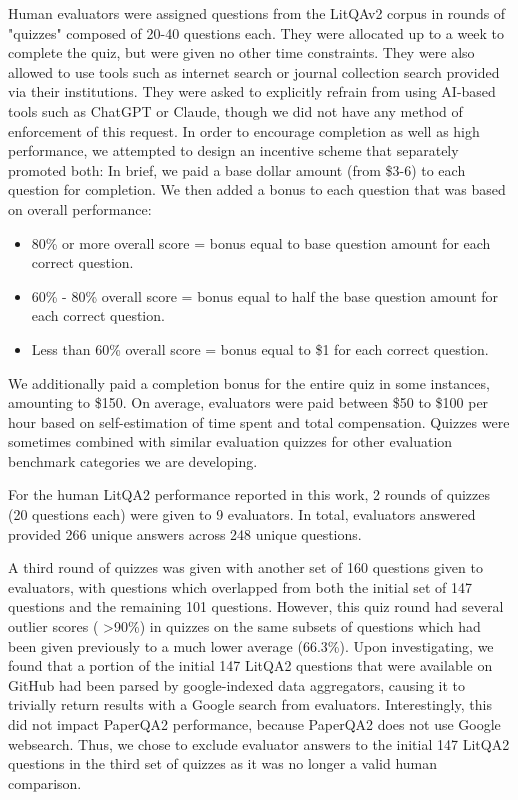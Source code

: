 Human evaluators were assigned questions from the LitQAv2 corpus in rounds of "quizzes" composed of 20-40 questions each. They were allocated up to a week to complete the quiz, but were given no other time constraints. They were also allowed to use tools such as internet search or journal collection search provided via their institutions. They were asked to explicitly refrain from using AI-based tools such as ChatGPT or Claude, though we did not have any method of enforcement of this request. In order to encourage completion as well as high performance, we attempted to design an incentive scheme that separately promoted both: In brief, we paid a base dollar amount (from \$3-6) to each question for completion. We then added a bonus to each question that was based on overall performance: 
\begin{itemize}
    \item{80\% or more overall score = bonus equal to base question amount for each correct question.}
    \item{60\% - 80\% overall score = bonus equal to half the base question amount for each correct question.}
    \item{Less than 60\% overall score = bonus equal to \$1 for each correct question.}
\end{itemize}

We additionally paid a completion bonus for the entire quiz in some instances, amounting to \$150. On average, evaluators were paid between \$50 to \$100 per hour based on self-estimation of time spent and total compensation. Quizzes were sometimes combined with similar evaluation quizzes for other evaluation benchmark categories we are developing.

For the human LitQA2 performance reported in this work, 2 rounds of quizzes (20 questions each) were given to 9 evaluators. In total, evaluators answered provided 266 unique answers across 248 unique questions.

A third round of quizzes was given with another set of 160 questions given to evaluators, with questions which overlapped from both the initial set of 147 questions and the remaining 101 questions. However, this quiz round had several outlier scores ( >90\%) in quizzes on the same subsets of questions which had been given previously to a much lower average (66.3\%). Upon investigating, we found that a portion of the initial 147 LitQA2 questions that were available on GitHub had been parsed by google-indexed data aggregators, causing it to trivially return results with a Google search from evaluators. Interestingly, this did not impact PaperQA2 performance, because PaperQA2 does not use Google websearch. Thus, we chose to exclude evaluator answers to the initial 147 LitQA2 questions in the third set of quizzes as it was no longer a valid human comparison.

